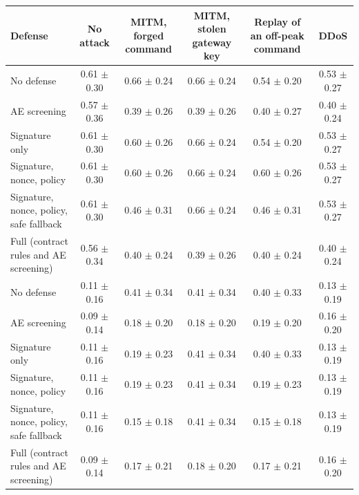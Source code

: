 \begin{tabular}{@{}lccccc@{}}
\toprule
Defense & No attack & MITM, forged command & MITM, stolen gateway key & Replay of an off-peak command & DDoS \\
\midrule
No defense & 0.61 $\pm$ 0.30 & 0.66 $\pm$ 0.24 & 0.66 $\pm$ 0.24 & 0.54 $\pm$ 0.20 & 0.53 $\pm$ 0.27 \\
AE screening & 0.57 $\pm$ 0.36 & 0.39 $\pm$ 0.26 & 0.39 $\pm$ 0.26 & 0.40 $\pm$ 0.27 & 0.40 $\pm$ 0.24 \\
Signature only & 0.61 $\pm$ 0.30 & 0.60 $\pm$ 0.26 & 0.66 $\pm$ 0.24 & 0.54 $\pm$ 0.20 & 0.53 $\pm$ 0.27 \\
Signature, nonce, policy & 0.61 $\pm$ 0.30 & 0.60 $\pm$ 0.26 & 0.66 $\pm$ 0.24 & 0.60 $\pm$ 0.26 & 0.53 $\pm$ 0.27 \\
Signature, nonce, policy, safe fallback & 0.61 $\pm$ 0.30 & 0.46 $\pm$ 0.31 & 0.66 $\pm$ 0.24 & 0.46 $\pm$ 0.31 & 0.53 $\pm$ 0.27 \\
Full (contract rules and AE screening) & 0.56 $\pm$ 0.34 & 0.40 $\pm$ 0.24 & 0.39 $\pm$ 0.26 & 0.40 $\pm$ 0.24 & 0.40 $\pm$ 0.24 \\
\midrule
No defense & 0.11 $\pm$ 0.16 & 0.41 $\pm$ 0.34 & 0.41 $\pm$ 0.34 & 0.40 $\pm$ 0.33 & 0.13 $\pm$ 0.19 \\
AE screening & 0.09 $\pm$ 0.14 & 0.18 $\pm$ 0.20 & 0.18 $\pm$ 0.20 & 0.19 $\pm$ 0.20 & 0.16 $\pm$ 0.20 \\
Signature only & 0.11 $\pm$ 0.16 & 0.19 $\pm$ 0.23 & 0.41 $\pm$ 0.34 & 0.40 $\pm$ 0.33 & 0.13 $\pm$ 0.19 \\
Signature, nonce, policy & 0.11 $\pm$ 0.16 & 0.19 $\pm$ 0.23 & 0.41 $\pm$ 0.34 & 0.19 $\pm$ 0.23 & 0.13 $\pm$ 0.19 \\
Signature, nonce, policy, safe fallback & 0.11 $\pm$ 0.16 & 0.15 $\pm$ 0.18 & 0.41 $\pm$ 0.34 & 0.15 $\pm$ 0.18 & 0.13 $\pm$ 0.19 \\
Full (contract rules and AE screening) & 0.09 $\pm$ 0.14 & 0.17 $\pm$ 0.21 & 0.18 $\pm$ 0.20 & 0.17 $\pm$ 0.21 & 0.16 $\pm$ 0.20 \\
\bottomrule
\end{tabular}